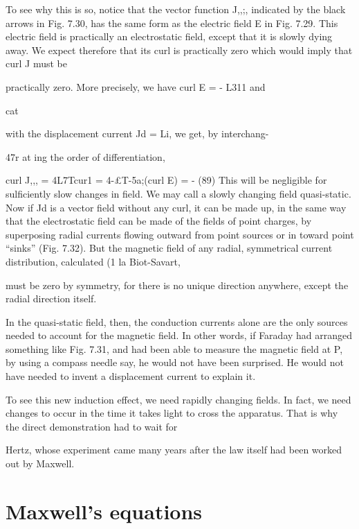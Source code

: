To see why this is so, notice that the vector function J,,;, indicated
by the black arrows in Fig. 7.30, has the same form as the electric
field E in Fig. 7.29. This electric field is practically an electrostatic
field, except that it is slowly dying away. We expect therefore that
its curl is practically zero which would imply that curl J must be

practically zero. More precisely, we have curl E = - L311 and

cat

with the displacement current Jd = Li, we get, by interchang-

47r at
ing the order of differentiation,

curl J,,, = 4L7Tcur1  = 4-£T-5a;(curl E) = -  (89)
This will be negligible for sulficiently slow changes in field. We
may call a slowly changing field quasi-static. Now if Jd is a vector
field without any curl, it can be made up, in the same way that the
electrostatic field can be made of the fields of point charges, by superposing
radial currents flowing outward from point sources or in
toward point ``sinks'' (Fig. 7.32). But the magnetic field of any
radial, symmetrical current distribution, calculated (1 la Biot-Savart,

must be zero by symmetry, for there is no unique direction anywhere,
except the radial direction itself.

In the quasi-static field, then, the conduction currents alone are
the only sources needed to account for the magnetic field. In other
words, if Faraday had arranged something like Fig. 7.31, and had
been able to measure the magnetic field at P, by using a compass
needle say, he would not have been surprised. He would not have
needed to invent a displacement current to explain it.

To see this new induction effect, we need rapidly changing fields.
In fact, we need changes to occur in the time it takes light to cross
the apparatus. That is why the direct demonstration had to wait for

Hertz, whose experiment came many years after the law itself had
been worked out by Maxwell.

\section{Maxwell's equations}

